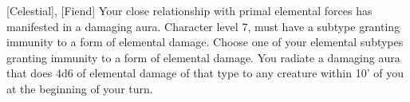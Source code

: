  {[Celestial], [Fiend]}
\shortdescfeat
{Your close relationship with primal elemental forces has manifested in a damaging aura.}
{Character level 7, must have a subtype granting immunity to a form of elemental damage.}
{Choose one of your elemental subtypes granting immunity to a form of elemental damage. You radiate a damaging aura that does 4d6 of elemental damage of that type to any creature within 10' of you at the beginning of your turn.}